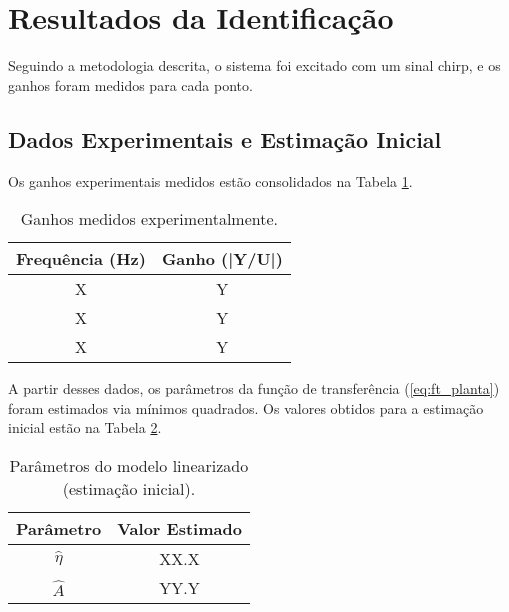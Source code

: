 \section{Resultados da Identificação}

Seguindo a metodologia descrita, o sistema foi excitado com um sinal chirp, e os ganhos foram medidos para cada ponto.

\subsection{Dados Experimentais e Estimação Inicial}
Os ganhos experimentais medidos estão consolidados na Tabela \ref{tab:ganhos}.

\begin{table}[h]
    \centering
    \caption{Ganhos medidos experimentalmente.}
    \label{tab:ganhos}
    \begin{tabular}{cc}
        \toprule
        \textbf{Frequência (Hz)} & \textbf{Ganho (|Y/U|)} \\
        \midrule
        X & Y \\ %
        X & Y \\ %
        X & Y \\ %
        \bottomrule
    \end{tabular}
\end{table}

A partir desses dados, os parâmetros da função de transferência (\ref{eq:ft_planta}) foram estimados via mínimos quadrados. Os valores obtidos para a estimação inicial estão na Tabela \ref{tab:parametros_inicial}.

\begin{table}[h]
    \centering
    \caption{Parâmetros do modelo linearizado (estimação inicial).}
    \label{tab:parametros_inicial}
    \begin{tabular}{cc}
        \toprule
        \textbf{Parâmetro} & \textbf{Valor Estimado} \\
        \midrule
        $\hat{\eta}$ & XX.X \\ %
        $\hat{A}$    & YY.Y \\ %
        \bottomrule
    \end{tabular}
\end{table}

